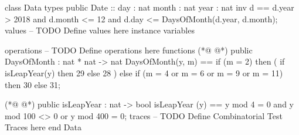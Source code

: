 \begin{vdmpp}[breaklines=true]
class Data
types
 public Date :: day : nat
          month : nat
          year : nat
  inv d == d.year > 2018 and 
    d.month <= 12 and
    d.day <=  DaysOfMonth(d.year, d.month);
values
-- TODO Define values here
instance variables
 
operations
-- TODO Define operations here
functions
(*@
\label{DaysOfMonth:16}
@*)
 public DaysOfMonth : nat * nat -> nat
 DaysOfMonth(y, m) == 
  if (m = 2) then (
   if isLeapYear(y) then 29
   else 28
  )
  else if (m = 4 or m = 6 or m = 9 or m = 11) then 30
  else 31;
 
(*@
\label{isLeapYear:25}
@*)
 public isLeapYear : nat -> bool
 isLeapYear (y) ==
  y mod 4 = 0 and y mod 100 <> 0 or y mod 400 = 0;
traces
-- TODO Define Combinatorial Test Traces here
end Data
\end{vdmpp}
